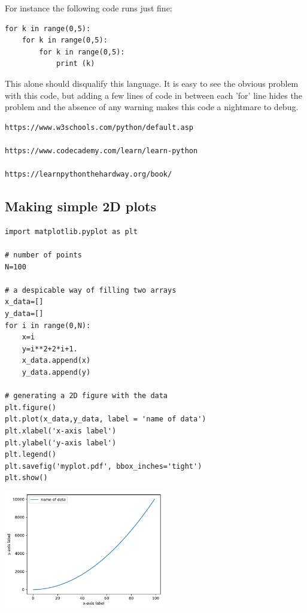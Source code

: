 For instance the following code runs just fine:

\begin{lstlisting}
for k in range(0,5): 
    for k in range(0,5):
        for k in range(0,5):
            print (k)
\end{lstlisting}

This alone should disqualify this language. It is easy to see the obvious problem with this code, but adding a few lines of code in between each 'for' line hides the problem and the absence of any warning makes this code a nightmare to debug.



\begin{verbatim}
https://www.w3schools.com/python/default.asp

https://www.codecademy.com/learn/learn-python

https://learnpythonthehardway.org/book/
\end{verbatim}

\subsection{Making simple 2D plots}

\begin{lstlisting}
import matplotlib.pyplot as plt

# number of points
N=100

# a despicable way of filling two arrays
x_data=[]
y_data=[]
for i in range(0,N):
    x=i
    y=i**2+2*i+1.
    x_data.append(x)
    y_data.append(y)

# generating a 2D figure with the data
plt.figure()
plt.plot(x_data,y_data, label = 'name of data')
plt.xlabel('x-axis label')
plt.ylabel('y-axis label')
plt.legend()
plt.savefig('myplot.pdf', bbox_inches='tight')
plt.show()
\end{lstlisting}

\begin{center}
\includegraphics[width=7cm]{images/python/myplot}
\end{center}

